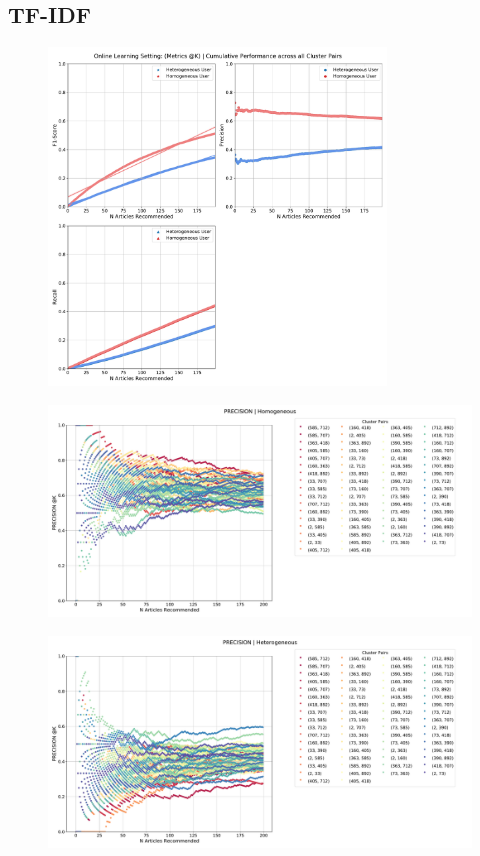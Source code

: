 \documentclass[a4paper,fontsize=8.0pt]{scrartcl}
\begin{document}
\subsection{TF-IDF}
\vspace{1ex}
\begin{figure}[H]
 \includegraphics[width=0.8\textwidth]{Graphs/TFIDF/user_interaction_vs_model_performance_cumu.pdf}
\end{figure}
\vspace{-4ex}
\begin{figure}[H]
 \includegraphics[width=1.0\textwidth]{Graphs/TFIDF/user_interaction_vs_model_performance_precision_all_cps_Homogeneous.pdf}
\end{figure}
\vspace{-1ex}
\begin{figure}[H]
 \includegraphics[width=1.0\textwidth]{Graphs/TFIDF/user_interaction_vs_model_performance_precision_all_cps_Heterogeneous.pdf}
\end{figure}
\end{document}
